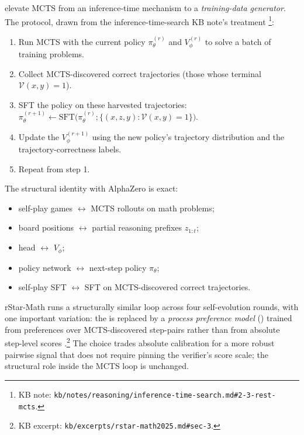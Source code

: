 \citet{zhang2024-rest-mcts} elevate MCTS from an inference-time
mechanism to a \emph{training-data generator}.
The protocol, drawn from the inference-time-search KB note's
treatment%
\footnote{KB note:
\nolinkurl{kb/notes/reasoning/inference-time-search.md#2-3-rest-mcts}.}:
\begin{enumerate}
\item Run MCTS with the current policy $\pi_\theta^{(r)}$ and 
$V_\phi^{(r)}$ to solve a batch of training problems.
\item Collect MCTS-discovered correct trajectories (those whose
terminal $\mathcal{V}(x, y) = 1$).
\item SFT the policy on these harvested trajectories:
$\pi_\theta^{(r+1)} \leftarrow \mathrm{SFT}\bigl(\pi_\theta^{(r)};
\{(x, z, y) : \mathcal{V}(x, y) = 1\}\bigr)$.
\item Update the  $V_\phi^{(r+1)}$ using the new policy's
trajectory distribution and the trajectory-correctness labels.
\item Repeat from step 1.
\end{enumerate}
The structural identity with AlphaZero
is exact:
\begin{itemize}
\item self-play games $\leftrightarrow$ MCTS rollouts on math problems;
\item board positions $\leftrightarrow$ partial reasoning prefixes
$z_{1:t}$;
\item {} head $\leftrightarrow$  $V_\phi$;
\item policy network $\leftrightarrow$ next-step policy $\pi_\theta$;
\item self-play SFT $\leftrightarrow$ SFT on MCTS-discovered correct
trajectories.
\end{itemize}
rStar-Math \citep{rstar-math2025} runs a structurally similar loop
across four self-evolution rounds, with one important variation: the
 is replaced by a \emph{process preference model} () trained
from preferences over MCTS-discovered step-pairs rather than from
absolute step-level scores
\citep[\S 3]{rstar-math2025}.\footnote{KB excerpt:
\nolinkurl{kb/excerpts/rstar-math2025.md#sec-3}.} The choice trades
absolute calibration for a more robust pairwise signal that does not
require pinning the verifier's score scale; the structural role
inside the MCTS loop is unchanged.

